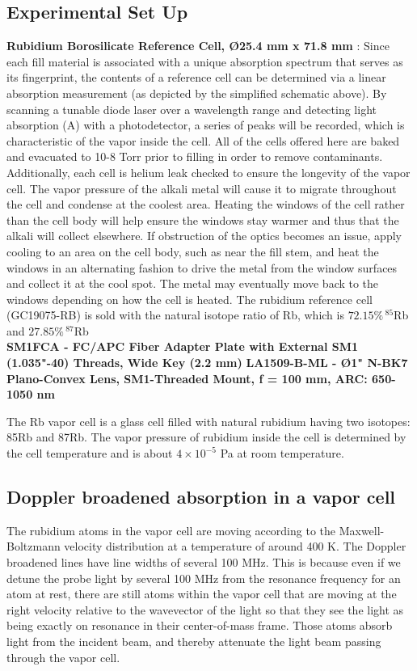 \documentclass[10pt]{article}
\begin{document}
\subsection*{Experimental Set Up}
\textbf{Rubidium Borosilicate Reference Cell, Ø25.4 mm x 71.8 mm } :
Since each fill material is associated with a unique absorption spectrum that serves as its fingerprint, the contents of a reference cell can be determined via a linear absorption measurement (as depicted by the simplified schematic above). By scanning a tunable diode laser over a wavelength range and detecting light absorption (A) with a photodetector, a series of peaks will be recorded, which is characteristic of the vapor inside the cell.
All of the cells offered here are baked and evacuated to 10-8 Torr prior to filling in order to remove contaminants. Additionally, each cell is helium leak checked to ensure the longevity of the vapor cell. The vapor pressure of the alkali metal will cause it to migrate throughout the cell and condense at the coolest area. Heating the windows of the cell rather than the cell body will help ensure the windows stay warmer and thus that the alkali will collect elsewhere. If obstruction of the optics becomes an issue, apply cooling to an area on the cell body, such as near the fill stem, and heat the windows in an alternating fashion to drive the metal from the window surfaces and collect it at the cool spot. The metal may eventually move back to the windows depending on how the cell is heated.
The rubidium reference cell (GC19075-RB) is sold with the natural isotope ratio of Rb, which is $72.15\% \, ^{85}$Rb and $27.85\% \, ^{87}$Rb  \\
\textbf{SM1FCA - FC/APC Fiber Adapter Plate with External SM1 (1.035"-40) Threads, Wide Key (2.2 mm)}
\textbf{LA1509-B-ML - Ø1" N-BK7 Plano-Convex Lens, SM1-Threaded Mount, f = 100 mm, ARC: 650-1050 nm }


The Rb vapor cell is a glass cell filled with natural rubidium having two isotopes: 85Rb and
87Rb. The vapor pressure of rubidium inside
the cell is determined by the cell temperature
and is about $4 \times 10^{-5}$ Pa at room temperature.

\subsection*{Doppler broadened absorption in a vapor cell}
The rubidium atoms in the vapor cell are moving according to the Maxwell-Boltzmann velocity distribution at a temperature of around 400 K. The Doppler broadened lines have line widths of several 100 MHz. This is because even if we detune the probe light by several 100 MHz from the resonance frequency for an atom at rest, there are still atoms within the vapor cell that are moving at the right velocity relative to the wavevector of the light so that they see the light as being exactly on resonance in their center-of-mass frame. Those atoms absorb light from the incident beam, and thereby attenuate the light beam passing through the vapor cell.
\end{document}
